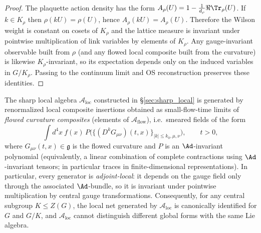 \begin{proof}
The plaquette action density has the form
$A_\rho(U)=1-\frac{1}{d_\rho}\Re\Tr_\rho(U)$.
If $k\in K_\rho$ then $\rho(kU)=\rho(U)$, hence $A_\rho(kU)=A_\rho(U)$.
Therefore the Wilson weight is constant on cosets of $K_\rho$ and the lattice measure is invariant under pointwise multiplication
of link variables by elements of $K_\rho$.
Any gauge-invariant observable built from $\rho$ (and any flowed local composite built from the curvature) is likewise $K_\rho$-invariant,
so its expectation depends only on the induced variables in $G/K_\rho$.
Passing to the continuum limit and OS reconstruction preserves these identities.
\end{proof}

\begin{lemma}
\label{lem:adjoint_local_generators}
The sharp local algebra $\mathcal A_{\mathrm{loc}}$ constructed in \S\ref{sec:sharp_local} is generated by renormalized local composite
insertions obtained as small-flow-time limits of \emph{flowed curvature composites} (elements of $\mathcal A_{\mathrm{flow}}$),
i.e.\ smeared fields of the form
\[
\int d^4x\ f(x)\,P\!\big(\{(D^{k}G_{\mu\nu})(t,x)\}_{|k|\le k_0,\mu,\nu}\big),
\qquad t>0,
\]
where $G_{\mu\nu}(t,x)\in\mathfrak g$ is the flowed curvature and $P$ is an $\Ad$-invariant polynomial (equivalently, a linear combination of
complete contractions using $\Ad$-invariant tensors; in particular traces in finite-dimensional representations).
In particular, every generator is \emph{adjoint-local}: it depends on the gauge field only through the associated $\Ad$-bundle,
so it is invariant under pointwise multiplication by central gauge transformations.
Consequently, for any central subgroup $K\le Z(G)$, the local net generated by $\mathcal A_{\mathrm{loc}}$ is canonically identified for $G$ and $G/K$,
and $\mathcal A_{\mathrm{loc}}$ cannot distinguish different global forms with the same Lie algebra.
\end{lemma}

